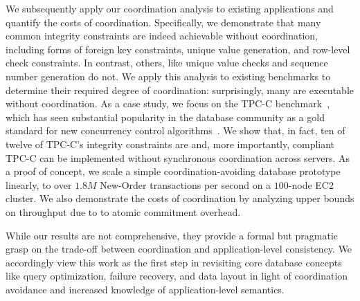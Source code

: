 
We subsequently apply our \iconfluence coordination analysis to
existing applications and quantify the costs of
coordination. Specifically, we demonstrate that many common integrity
constraints are indeed achievable without coordination, including
forms of foreign key constraints, unique value generation, and
row-level check constraints. In contrast, others, like unique value
checks and sequence number generation do not. We apply this analysis
to existing benchmarks to determine their required degree of
coordination: surprisingly, many are executable without
coordination. As a case study, we focus on the TPC-C
benchmark~\cite{tpcc}, which has seen substantial popularity in the
database community as a gold standard for new concurrency control
algorithms~\cite{abadi-vll,jones-dtxn,schism,calvin,hstore}. We show
that, in fact, ten of twelve of TPC-C's integrity constraints are
\iconfluent and, more importantly, compliant TPC-C can be implemented
without synchronous coordination across servers. As a proof of
concept, we scale a simple coordination-avoiding database prototype
linearly, to over $1.8M$ New-Order transactions per second on a
$100$-node EC2 cluster. We also demonstrate the costs of coordination
by analyzing upper bounds on throughput due to to atomic commitment
overhead.

While our results are not comprehensive, they provide a formal but
pragmatic grasp on the trade-off between coordination and
application-level consistency. We accordingly view this work as the
first step in revisiting core database concepts like query
optimization, failure recovery, and data layout in light of
coordination avoidance and increased knowledge of application-level
semantics.


